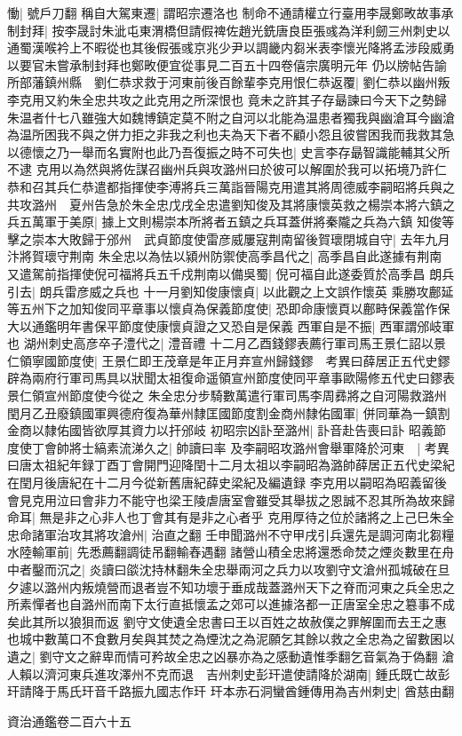慟|{
	號戶刀翻}
稱自大駕東遷|{
	謂昭宗遷洛也}
制命不通請權立行臺用李晟鄭畋故事承制封拜|{
	按李晟討朱泚屯東渭橋但請假禆佐趙光銑唐良臣張彧為洋利劒三州刺史以通蜀漢喉衿上不暇從也其後假張彧京兆少尹以調畿内芻米表李懷光降將孟涉段威勇以要官未嘗承制封拜也鄭畋便宜從事見二百五十四卷僖宗廣明元年}
仍以牓帖告諭所部藩鎮州縣　劉仁恭求救于河東前後百餘輩李克用恨仁恭返覆|{
	劉仁恭以幽州叛李克用又約朱全忠共攻之此克用之所深恨也}
竟未之許其子存朂諫曰今天下之勢歸朱温者什七八雖強大如魏博鎮定莫不附之自河以北能為温患者獨我與幽滄耳今幽滄為温所困我不與之併力拒之非我之利也夫為天下者不顧小怨且彼嘗困我而我救其急以德懷之乃一舉而名實附也此乃吾復振之時不可失也|{
	史言李存朂智識能輔其父所不逮}
克用以為然與將佐謀召幽州兵與攻潞州曰於彼可以解圍於我可以拓境乃許仁恭和召其兵仁恭遣都指揮使李溥將兵三萬詣晉陽克用遣其將周德威李嗣昭將兵與之共攻潞州　夏州告急於朱全忠戊戌全忠遣劉知俊及其將康懷英救之楊崇本將六鎮之兵五萬軍于美原|{
	據上文則楊崇本所將者五鎮之兵耳蓋併將秦隴之兵為六鎮}
知俊等擊之崇本大敗歸于邠州　武貞節度使雷彦威屢寇荆南留後賀瓌閉城自守|{
	去年九月汴將賀瓌守荆南}
朱全忠以為怯以潁州防禦使高季昌代之|{
	高季昌自此遂據有荆南}
又遣駕前指揮使倪可福將兵五千戍荆南以備吳蜀|{
	倪可福自此遂委質於高季昌}
朗兵引去|{
	朗兵雷彦威之兵也}
十一月劉知俊康懷貞|{
	以此觀之上文誤作懷英}
乘勝攻鄜延等五州下之加知俊同平章事以懷貞為保義節度使|{
	恐即命康懷頁以鄜畤保義當作保大以通鑑明年書保平節度使康懷貞證之又恐自是保義}
西軍自是不振|{
	西軍謂邠岐軍也}
湖州刺史高彦卒子澧代之|{
	澧音禮}
十二月乙酉錢鏐表薦行軍司馬王景仁詔以景仁領寧國節度使|{
	王景仁即王茂章是年正月弃宣州歸錢鏐　考異曰薛居正五代史鏐辟為兩府行軍司馬具以狀聞太祖復命遥領宣州節度使同平章事歐陽修五代史曰鏐表景仁領宣州節度使今從之}
朱全忠分步騎數萬遣行軍司馬李周彞將之自河陽救潞州　閏月乙丑廢鎮國軍興德府復為華州隸匡國節度割金商州隸佑國軍|{
	併同華為一鎮割金商以隸佑國皆欲厚其資力以扞邠岐}
初昭宗凶訃至潞州|{
	訃音赴告喪曰訃}
昭義節度使丁會帥將士縞素流涕久之|{
	帥讀曰率}
及李嗣昭攻潞州會舉軍降於河東　|{
	考異曰唐太祖紀年録丁酉丁會開門迎降閏十二月太祖以李嗣昭為潞帥薛居正五代史梁紀在閏月後唐紀在十二月今從新舊唐紀薛史梁紀及編遺録}
李克用以嗣昭為昭義留後會見克用泣曰會非力不能守也梁王陵虐唐室會雖受其舉拔之恩誠不忍其所為故來歸命耳|{
	無是非之心非人也丁會其有是非之心者乎}
克用厚待之位於諸將之上己巳朱全忠命諸軍治攻其將攻滄州|{
	治直之翻}
壬申聞潞州不守甲戌引兵還先是調河南北芻糧水陸輸軍前|{
	先悉薦翻調徒吊翻輸舂遇翻}
諸營山積全忠將還悉命焚之煙炎數里在舟中者鑿而沉之|{
	炎讀曰燄沈持林翻朱全忠舉兩河之兵力以攻劉守文滄州孤城破在旦夕遽以潞州内叛燒營而退者豈不知功壞于垂成哉蓋潞州天下之脊而河東之兵全忠之所素憚者也自潞州而南下太行直抵懷孟之郊可以進據洛都一正唐室全忠之簒事不成矣此其所以狼狽而返}
劉守文使遺全忠書曰王以百姓之故赦僕之罪解圍而去王之惠也城中數萬口不食數月矣與其焚之為煙沈之為泥願乞其餘以救之全忠為之留數囷以遺之|{
	劉守文之辭卑而情可矜故全忠之凶暴亦為之感動遺惟季翻乞音氣為于偽翻}
滄人賴以濟河東兵進攻澤州不克而退　吉州刺史彭玕遣使請降於湖南|{
	鍾氏既亡故彭玕請降于馬氏玕音千路振九國志作玕}
玕本赤石洞蠻酋鍾傳用為吉州刺史|{
	酋慈由翻}


資治通鑑卷二百六十五
